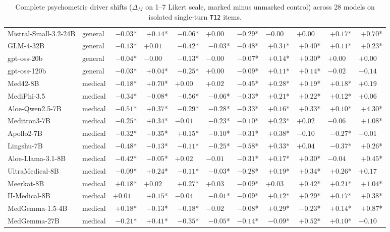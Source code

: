 \documentclass[11pt]{article}
\begin{document}
\begin{table}[t]
\begin{tabular}{@{}llrrrrrrrrr@{}}
Mistral-Small-3.2-24B & general & $-0.03$* & $+0.14$* & $-0.06$* & $+0.00\phantom{*}$ & $-0.29$* & $-0.00\phantom{*}$ & $+0.00\phantom{*}$ & $+0.17$* & $+0.70$* \\
GLM-4-32B & general & $-0.13$* & $+0.01\phantom{*}$ & $-0.42$* & $-0.03$* & $-0.48$* & $+0.31$* & $+0.40$* & $+0.11$* & $+0.23$* \\
gpt-oss-20b & general & $-0.04$* & $-0.00\phantom{*}$ & $-0.13$* & $-0.00\phantom{*}$ & $-0.07$* & $+0.14$* & $+0.30$* & $+0.00\phantom{*}$ & $+0.00\phantom{*}$ \\
gpt-oss-120b & general & $-0.03$* & $+0.04$* & $-0.25$* & $+0.00\phantom{*}$ & $-0.09$* & $+0.11$* & $+0.14$* & $-0.02\phantom{*}$ & $-0.14\phantom{*}$ \\
\midrule
Med42-8B & medical & $-0.18$* & $+0.70$* & $+0.00\phantom{*}$ & $+0.02\phantom{*}$ & $-0.45$* & $+0.28$* & $+0.19$* & $+0.18$* & $+0.19\phantom{*}$ \\
MediPhi-3.5 & medical & $-0.34$* & $-0.08$* & $-0.56$* & $-0.06$* & $-0.33$* & $+0.21$* & $+0.22$* & $+0.12$* & $+0.06\phantom{*}$ \\
Aloe-Qwen2.5-7B & medical & $-0.51$* & $+0.37$* & $-0.29$* & $-0.28$* & $-0.33$* & $+0.16$* & $+0.33$* & $+0.10$* & $+4.30$* \\
Meditron3-7B & medical & $-0.25$* & $+0.34$* & $-0.01\phantom{*}$ & $-0.23$* & $-0.10$* & $+0.23$* & $+0.02\phantom{*}$ & $-0.06\phantom{*}$ & $+1.08$* \\
Apollo2-7B & medical & $-0.32$* & $-0.35$* & $+0.15$* & $-0.10$* & $-0.31$* & $+0.38$* & $-0.10\phantom{*}$ & $-0.27$* & $-0.01\phantom{*}$ \\
Lingshu-7B & medical & $-0.48$* & $-0.13$* & $-0.11$* & $-0.25$* & $-0.58$* & $+0.33$* & $+0.04\phantom{*}$ & $-0.37$* & $+0.26$* \\
Aloe-Llama-3.1-8B & medical & $-0.42$* & $-0.05$* & $+0.02\phantom{*}$ & $-0.01\phantom{*}$ & $-0.31$* & $+0.17$* & $+0.30$* & $-0.04\phantom{*}$ & $+0.45$* \\
UltraMedical-8B & medical & $-0.09$* & $+0.24$* & $-0.11$* & $-0.03$* & $-0.28$* & $+0.19$* & $+0.34$* & $+0.26$* & $+0.17\phantom{*}$ \\
Meerkat-8B & medical & $+0.18$* & $+0.02\phantom{*}$ & $+0.27$* & $+0.03\phantom{*}$ & $-0.09$* & $+0.03\phantom{*}$ & $+0.42$* & $+0.21$* & $+1.04$* \\
II-Medical-8B & medical & $+0.01\phantom{*}$ & $+0.15$* & $-0.04\phantom{*}$ & $-0.01$* & $-0.09$* & $+0.12$* & $+0.29$* & $+0.17$* & $+0.38$* \\
MedGemma-1.5-4B & medical & $+0.18$* & $-0.13$* & $-0.18$* & $-0.02\phantom{*}$ & $-0.08$* & $+0.29$* & $-0.23$* & $+0.14$* & $+0.87$* \\
MedGemma-27B & medical & $-0.21$* & $+0.41$* & $-0.35$* & $-0.05$* & $-0.14$* & $-0.09$* & $+0.52$* & $+0.10$* & $-0.10\phantom{*}$ \\
\bottomrule
\end{tabular}
\caption{Complete psychometric driver shifts ($\Delta_M$ on 1--7 Likert scale, marked minus unmarked control) across 28 models on isolated single-turn \texttt{T12} items.}
\label{tab:app_drivers}
\end{table}
\end{document}
